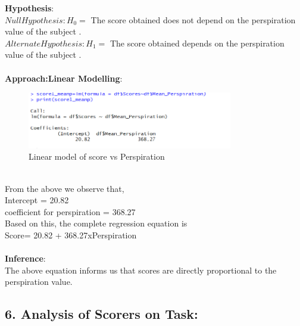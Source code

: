 \documentclass[12pt,epsf]{report}
\begin{document}
\textbf{Hypothesis}:\\
$Null Hypothesis : H_0 = $ The score obtained does not depend on the perspiration value  of the subject .\\
$Alternate Hypothesis : H_1 = $ The score obtained depends on the perspiration value of the subject .\\
\\
\textbf{Approach:Linear Modelling}:\\
\begin{figure}[!ht]
	\centering
	\includegraphics[width=0.8\textwidth]{Picture5}
	\caption{Linear model of score vs Perspiration}
	\centering
\end{figure}
\\
From the above we observe that,\\
Intercept = 20.82 \\
coefficient for perspiration = 368.27 \\
Based on this, the complete regression equation is \\
Score= 20.82 + 368.27xPerspiration\\
\\
\textbf{Inference}:\\
The above equation informs us that scores are directly proportional to the perspiration value. \\


\subsection*{6. Analysis of Scorers on Task:}
\end{document}
